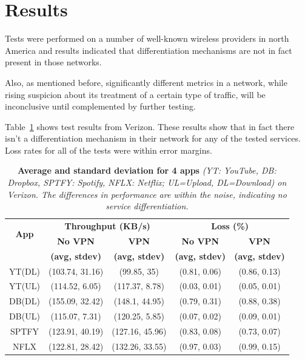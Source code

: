\documentclass[letterpaper]{sig-alternate-10pt}
\begin{document}
\section{Results}

Tests were performed on a number of well-known wireless providers in north America and results indicated that differentiation mechanisms are not in fact present in those networks.

Also, as mentioned before, significantly different metrics in a network, while rising suspicion about its treatment of a certain type of traffic, will be inconclusive until complemented by further testing.

Table~\ref{tab:svcdiff} shows test results from Verizon. These results show that in fact there isn't a differentiation mechanism in their network for any of the tested services. Loss rates for all of the tests were within error margins.
\begin{table}
\centering
\begin{small}
\setlength{\tabcolsep}{.01em}
\begin{tabular}{|c|c|c|c|c|}
\hline
\multirow{2}{*}{\bf App}&\multicolumn{2}{c|}{\bf Throughput (KB/s)}& \multicolumn{2}{c|}{\bf Loss (\%)} \tabularnewline
\cline{2-5}
                             &{\bf No VPN} &{\bf VPN}&{\bf No VPN}&{\bf VPN}   \tabularnewline
                             &{\bf (avg, stdev)} &{\bf (avg, stdev)}&{\bf (avg, stdev)}&{\bf (avg, stdev)}   \tabularnewline
\hline

YT(DL)&(103.74, 31.16)&(99.85, 35)&(0.81, 0.06)&(0.86, 0.13) \tabularnewline
\hline
YT(UL)&(114.52, 6.05)&(117.37, 8.78)&(0.03, 0.01)&(0.05, 0.01) \tabularnewline
\hline
DB(DL) &(155.09, 32.42)&(148.1, 44.95)&(0.79, 0.31)&(0.88, 0.38) \tabularnewline
\hline
DB(UL)&(115.07, 7.31)&(120.25, 5.85)&(0.07, 0.02)&(0.09, 0.01) \tabularnewline
\hline
SPTFY&(123.91, 40.19)&(127.16, 45.96)&(0.83, 0.08)&(0.73, 0.07) \tabularnewline
\hline
NFLX&(122.81, 28.42)&(132.26, 33.55)&(0.97, 0.03)&(0.99, 0.15) \tabularnewline
\hline
\end{tabular}
\end{small}
\caption{ \textbf{Average and standard deviation for 4  apps } \emph{(YT: YouTube, DB: Dropbox, SPTFY: Spotify, NFLX: Netflix; UL=Upload, DL=Download) on 
Verizon. The differences in performance are within the noise, indicating no service differentiation. }}
\label{tab:svcdiff}
\end{table}
\end{document}
